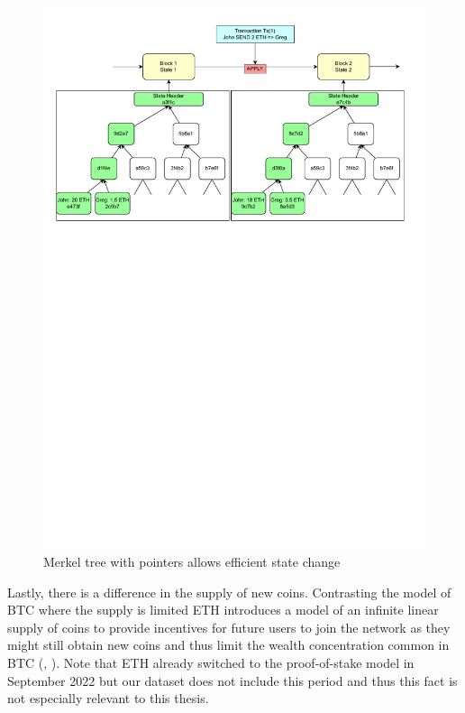 \begin{center}
    \begin{figure}[H]
        \centering
            \includegraphics[width=1\textwidth]{Figures/merkle-tree.pdf}
        \caption{Merkel tree with pointers allows efficient state change}
        \label{fig:merkel}
    \end{figure}
\end{center}


Lastly, there is a difference in the supply of new coins.
Contrasting the model of \ac{BTC} where the supply is limited \ac{ETH} introduces 
a model of an infinite linear supply of coins to provide incentives 
for future users to join the network as they might still obtain 
new coins and thus limit the wealth concentration common in \ac{BTC} (\cite{buterin2013ethereum}, \cite{Tikhomirov2018}).
Note that \ac{ETH} already switched to the proof-of-stake model in September 2022
but our dataset does not include this period and thus this fact 
is not especially relevant to this thesis.



